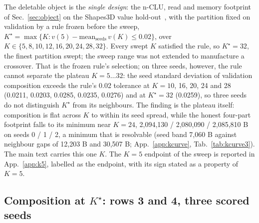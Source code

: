 \documentclass{article} %
\newcommand{\Kstar}{\ensuremath{K^{\star}}}
\begin{document}
The deletable object is the \emph{single design}: the n-CLU, read and memory footprint of
Sec.~\ref{sec:object} on the Shapes3D value hold-out~\citep{montero2021role,schott2021visual}, with the partition fixed on validation
by a rule frozen before the sweep, $\Kstar=\max\{K : v(5)-\text{mean}_{\text{seeds}}\,v(K)\le
0.02\}$, over $K\in\{5,8,10,12,16,20,24,28,32\}$. Every swept $K$ satisfied the rule, so
$\Kstar=32$, the finest partition swept; the sweep range was not extended to manufacture a
crossover. %
That is the frozen rule's selection; on three seeds, however, the rule cannot separate the plateau
$K=5\ldots32$: the seed standard deviation of validation composition exceeds the rule's 0.02
tolerance at $K=10$, 16, 20, 24 and 28 (0.0211, 0.0203, 0.0285, 0.0235, 0.0276) and at $\Kstar=32$ %
(0.0259), so three seeds do not distinguish $\Kstar$ from its neighbours. %
The finding is the plateau itself: composition is flat across $K$ to within its seed spread, while
the honest four-part footprint falls to its minimum near $K=24$, 2,094,130 / 2,080,090 / 2,085,810 B %
on seeds 0 / 1 / 2, a minimum that is resolvable (seed band 7,060 B against neighbour gaps of %
12,203 B and 30,507 B; App.~\ref{app:kcurve}, Tab.~\ref{tab:kcurve3}). %
The main text carries this one $K$. The $K=5$ endpoint of the sweep is reported in
App.~\ref{app:k5}, labelled as the endpoint, with its sign stated as a property of $K=5$.

\subsection{Composition at $\Kstar$: rows 3 and 4, three scored seeds}
\label{sec:shapes-t7}
\end{document}
